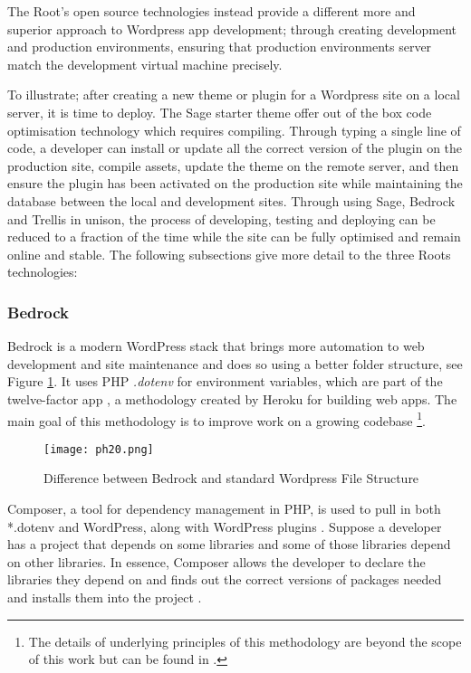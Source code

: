 \documentclass[fontsize=11pt]{extarticle}
\numberwithin{figure}{section} %
\numberwithin{table}{section}%
\begin{document}
The Root's open source technologies instead provide a different more and
superior approach to Wordpress app development; through creating
development and production environments, ensuring that production
environments server match the development virtual machine precisely.

To illustrate; after creating a new theme or plugin for a Wordpress site
on a local server, it is time to deploy. The Sage starter theme offer
out of the box code optimisation technology which requires compiling.
Through typing a single line of code, a developer can install or update
all the correct version of the plugin on the production site, compile
assets, update the theme on the remote server, and then ensure the
plugin has been activated on the production site while maintaining the
database between the local and development sites. Through using Sage,
Bedrock and Trellis in unison, the process of developing, testing and
deploying can be reduced to a fraction of the time while the site can be
fully optimised and remain online and stable. The following subsections
give more detail to the three Roots technologies:

\hypertarget{bedrock}{%
\subsubsection{Bedrock}\label{bedrock}}

Bedrock is a modern WordPress stack that brings more automation to web
development and site maintenance and does so using a better folder
structure, see Figure \ref{bedrockfolder}. It uses PHP \emph{.dotenv}
for environment variables, which are part of the twelve-factor app
\cite{p6}, a methodology created by Heroku for building web
apps\cite{p5}. The main goal of this methodology is to improve work on a
growing codebase
\footnote{The details of underlying principles of this methodology are beyond the scope of this work but can be found in \cite{p8}.}.

\begin{figure}[H]
      \centering
      \texttt{[image: ph20.png]}
      \caption{Difference between Bedrock and standard Wordpress File Structure}
\label{bedrockfolder}
 \end{figure}

Composer, a tool for dependency management in PHP, is used to pull in
both *.dotenv and WordPress, along with WordPress plugins \cite{p7}.
Suppose a developer has a project that depends on some libraries and
some of those libraries depend on other libraries. In essence, Composer
allows the developer to declare the libraries they depend on and finds
out the correct versions of packages needed and installs them into the
project \cite{p8}.
\end{document}

